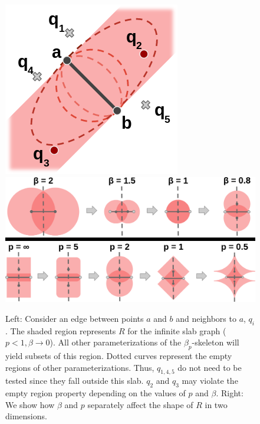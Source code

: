 \begin{figure}[b]
    \includegraphics[width=0.34\linewidth]{figs/chap7/infinite_slab.png}
    \includegraphics[width=0.64\linewidth]{figs/chap7/variable_parameters.png}
    \caption[Illustration of various $\beta_p$-skeleton shapes]{Left: Consider an edge between points $a$ and $b$ and neighbors to $a$, $q_{i}$.
    The shaded region represents $R$ for the infinite slab graph ($p < 1, \beta \rightarrow 0$).
    All other parameterizations of the $\beta_p$-skeleton will yield subsets of this region.
    Dotted curves represent the empty regions of other parameterizations.
    Thus, $q_{1,4,5}$ do not need to be tested since they fall outside this slab.
    $q_2$ and $q_3$ may violate the empty region property depending on the values of $p$ and $\beta$.
    Right: We show how $\beta$ and $p$ separately affect the shape of $R$ in two dimensions.}
    \label{fig:infinite_slab}
\end{figure}

